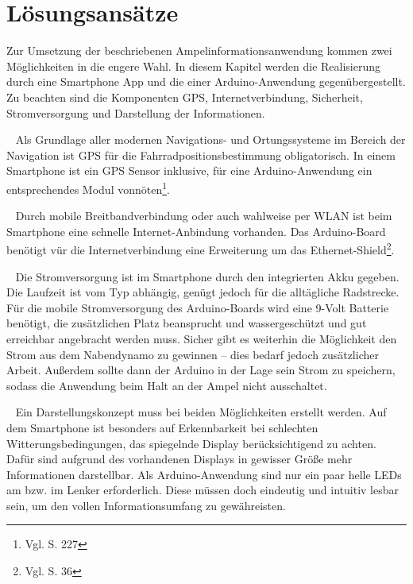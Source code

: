 \chapter{Lösungsansätze}
Zur Umsetzung der beschriebenen Ampelinformationsanwendung kommen zwei Möglichkeiten in die engere Wahl. In diesem Kapitel werden die Realisierung durch eine \gls{Smartphone} App und die einer \gls{Arduino}-Anwendung gegenübergestellt. Zu beachten sind die Komponenten \gls{GPS}, Internetverbindung, Sicherheit, Stromversorgung und Darstellung der Informationen.\\
\begin{description}[leftmargin=0.7cm,style=nextline]
  \item[\gls{GPS}] ~ Als Grundlage aller modernen Navigations- und Ortungssysteme im Bereich der Navigation ist \gls{GPS} für die Fahrradpositionsbestimmung obligatorisch. In einem \gls{Smartphone} ist ein \gls{GPS} Sensor inklusive, für eine \gls{Arduino}-Anwendung ein entsprechendes Modul vonnöten\footnote{ Vgl. \cite{arduino} S. 227}.\\
  \item[Internetverbindung] ~ Durch mobile Breitbandverbindung oder auch wahlweise per \gls{WLAN} ist beim \gls{Smartphone} eine schnelle Internet-Anbindung vorhanden. 
  Das \gls{Arduino}-Board benötigt vür die Internetverbindung eine Erweiterung um das Ethernet-Shield\footnote{ Vgl. \cite{arduino} S. 36}.\\
  \item[Stromversorgung] ~ Die Stromversorgung ist im \gls{Smartphone} durch den integrierten Akku gegeben. Die Laufzeit ist vom Typ abhängig, genügt jedoch für die alltägliche Radstrecke. Für die mobile Stromversorgung des \gls{Arduino}-Boards wird eine 9-Volt Batterie benötigt, die zusätzlichen Platz beansprucht und wassergeschützt und gut erreichbar angebracht werden muss. Sicher gibt es weiterhin die Möglichkeit den Strom aus dem Nabendynamo zu gewinnen -- dies bedarf jedoch zusätzlicher Arbeit. Außerdem sollte dann der \gls{Arduino} in der Lage sein Strom zu speichern, sodass die Anwendung beim Halt an der Ampel nicht ausschaltet.\\
  \item[Darstellung] ~ Ein Darstellungskonzept muss bei beiden Möglichkeiten erstellt werden. Auf dem \gls{Smartphone} ist besonders auf Erkennbarkeit bei schlechten Witterungsbedingungen, das spiegelnde Display berücksichtigend zu achten. Dafür sind aufgrund des vorhandenen Displays in gewisser Größe mehr Informationen darstellbar. Als \gls{Arduino}-Anwendung sind nur ein paar helle \glspl{LED} am bzw. im Lenker erforderlich. Diese müssen doch eindeutig und intuitiv lesbar sein, um den vollen Informationsumfang zu gewähreisten.

\end{description}
